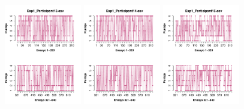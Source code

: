 \begin{figure}[th]
\includegraphics[width=0.30\textwidth]{Figures/Rating_Exp1_P13} \includegraphics[width=0.30\textwidth]{Figures/Rating_Exp1_P14} \includegraphics[width=0.30\textwidth]{Figures/Rating_Exp1_P15}

\end{figure}
